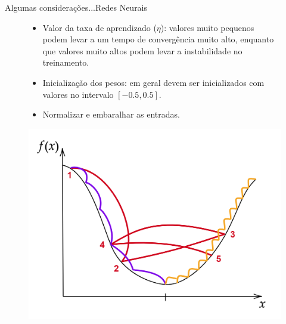 \documentclass[t]{beamer}
\begin{document}
\begin{ftst}{Algumas considerações...}{Redes Neurais}
\begin{figure}[!htb]
    \centering
    \begin{minipage}{.5\textwidth}
        \footnotesize
        \begin{itemize}
        \item Valor da taxa de aprendizado ($\eta$): valores muito pequenos podem levar a um tempo de convergência muito alto, enquanto que valores muito altos podem levar a instabilidade no treinamento.
        \item Inicialização dos pesos: em geral devem ser inicializados com valores no intervalo $[-0.5,0.5]$.
        \item Normalizar e embaralhar as entradas.
\end{itemize}
    \end{minipage}%
    \begin{minipage}{0.5\textwidth}
        \centering
        \includegraphics[scale=0.12]{Figuras/learning_rate.png}
    \end{minipage}
\end{figure}

\end{ftst}

\end{document}
